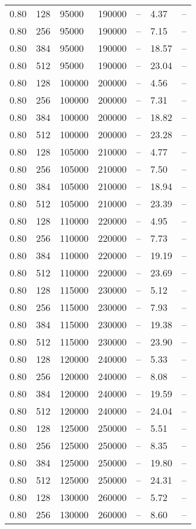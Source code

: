 \begin{tabular}{l|l|l|l|l|l|l}
0.80 & 128 &  95000 & 190000 & -- &  4.37 & --\\
0.80 & 256 &  95000 & 190000 & -- &  7.15 & --\\
0.80 & 384 &  95000 & 190000 & -- & 18.57 & --\\
0.80 & 512 &  95000 & 190000 & -- & 23.04 & --\\
0.80 & 128 & 100000 & 200000 & -- &  4.56 & --\\
0.80 & 256 & 100000 & 200000 & -- &  7.31 & --\\
0.80 & 384 & 100000 & 200000 & -- & 18.82 & --\\
0.80 & 512 & 100000 & 200000 & -- & 23.28 & --\\
0.80 & 128 & 105000 & 210000 & -- &  4.77 & --\\
0.80 & 256 & 105000 & 210000 & -- &  7.50 & --\\
0.80 & 384 & 105000 & 210000 & -- & 18.94 & --\\
0.80 & 512 & 105000 & 210000 & -- & 23.39 & --\\
0.80 & 128 & 110000 & 220000 & -- &  4.95 & --\\
0.80 & 256 & 110000 & 220000 & -- &  7.73 & --\\
0.80 & 384 & 110000 & 220000 & -- & 19.19 & --\\
0.80 & 512 & 110000 & 220000 & -- & 23.69 & --\\
0.80 & 128 & 115000 & 230000 & -- &  5.12 & --\\
0.80 & 256 & 115000 & 230000 & -- &  7.93 & --\\
0.80 & 384 & 115000 & 230000 & -- & 19.38 & --\\
0.80 & 512 & 115000 & 230000 & -- & 23.90 & --\\
0.80 & 128 & 120000 & 240000 & -- &  5.33 & --\\
0.80 & 256 & 120000 & 240000 & -- &  8.08 & --\\
0.80 & 384 & 120000 & 240000 & -- & 19.59 & --\\
0.80 & 512 & 120000 & 240000 & -- & 24.04 & --\\
0.80 & 128 & 125000 & 250000 & -- &  5.51 & --\\
0.80 & 256 & 125000 & 250000 & -- &  8.35 & --\\
0.80 & 384 & 125000 & 250000 & -- & 19.80 & --\\
0.80 & 512 & 125000 & 250000 & -- & 24.31 & --\\
0.80 & 128 & 130000 & 260000 & -- &  5.72 & --\\
0.80 & 256 & 130000 & 260000 & -- &  8.60 & --\\

\end{tabular}
